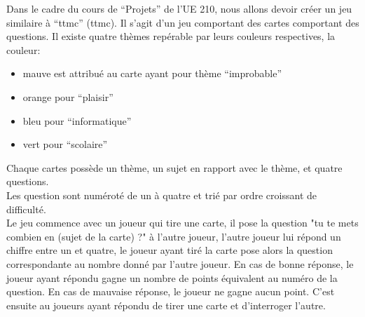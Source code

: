 Dans le cadre du cours de ``Projets'' de l'UE 210, nous allons devoir créer un jeu similaire à ``\acrlong{ttmc}'' (\acrshort{ttmc}). Il s'agit d'un jeu comportant des cartes comportant des questions. Il existe quatre thèmes repérable par leurs couleurs respectives, la couleur:
\begin{itemize}
	\item mauve est attribué au carte ayant pour thème ``improbable''
	\item orange pour ``plaisir''
	\item bleu pour ``informatique''
	\item vert pour ``scolaire''
\end{itemize}
Chaque cartes possède un thème, un sujet en rapport avec le thème, et quatre questions.\\
Les question sont numéroté de un à quatre et trié par ordre croissant de difficulté.\\
Le jeu commence avec un joueur qui tire une carte, il pose la question "tu te mets combien en (sujet de la carte) ?" à l'autre joueur, l'autre joueur lui répond un chiffre entre un et quatre, le joueur ayant tiré la carte pose alors la question correspondante au nombre donné par l'autre joueur. En cas de bonne réponse, le joueur ayant répondu gagne un nombre de points équivalent au numéro de la question. En cas de mauvaise réponse, le joueur ne gagne aucun point. C'est ensuite au joueurs ayant répondu de tirer une carte et d'interroger l'autre.
   
